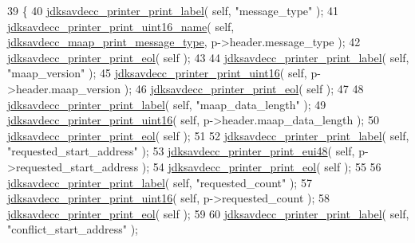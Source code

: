 \begin{DoxyCode}
39 \{
40     \hyperlink{group__util_gaf7818b24143b3c7502926a425a242ff5}{jdksavdecc\_printer\_print\_label}( \textcolor{keyword}{self}, \textcolor{stringliteral}{"message\_type"} );
41     \hyperlink{group__util_ga62486d864a66773d19bbbe23cebf346a}{jdksavdecc\_printer\_print\_uint16\_name}( \textcolor{keyword}{self}, 
      \hyperlink{group__maap__print_ga1f5dd2597dc39232da1f2dfbb975bf25}{jdksavdecc\_maap\_print\_message\_type}, p->header.message\_type );
42     \hyperlink{group__util_gacda56c9d3d24593a52c999682fa6e6e3}{jdksavdecc\_printer\_print\_eol}( \textcolor{keyword}{self} );
43 
44     \hyperlink{group__util_gaf7818b24143b3c7502926a425a242ff5}{jdksavdecc\_printer\_print\_label}( \textcolor{keyword}{self}, \textcolor{stringliteral}{"maap\_version"} );
45     \hyperlink{group__util_ga9793e0ff8e7ed25d957282ee6b257ce2}{jdksavdecc\_printer\_print\_uint16}( \textcolor{keyword}{self}, p->header.maap\_version );
46     \hyperlink{group__util_gacda56c9d3d24593a52c999682fa6e6e3}{jdksavdecc\_printer\_print\_eol}( \textcolor{keyword}{self} );
47 
48     \hyperlink{group__util_gaf7818b24143b3c7502926a425a242ff5}{jdksavdecc\_printer\_print\_label}( \textcolor{keyword}{self}, \textcolor{stringliteral}{"maap\_data\_length"} );
49     \hyperlink{group__util_ga9793e0ff8e7ed25d957282ee6b257ce2}{jdksavdecc\_printer\_print\_uint16}( \textcolor{keyword}{self}, p->header.maap\_data\_length );
50     \hyperlink{group__util_gacda56c9d3d24593a52c999682fa6e6e3}{jdksavdecc\_printer\_print\_eol}( \textcolor{keyword}{self} );
51 
52     \hyperlink{group__util_gaf7818b24143b3c7502926a425a242ff5}{jdksavdecc\_printer\_print\_label}( \textcolor{keyword}{self}, \textcolor{stringliteral}{"requested\_start\_address"} );
53     \hyperlink{group__util_gacb8108c4a12e752331804ec34d89f9ab}{jdksavdecc\_printer\_print\_eui48}( \textcolor{keyword}{self}, p->requested\_start\_address );
54     \hyperlink{group__util_gacda56c9d3d24593a52c999682fa6e6e3}{jdksavdecc\_printer\_print\_eol}( \textcolor{keyword}{self} );
55 
56     \hyperlink{group__util_gaf7818b24143b3c7502926a425a242ff5}{jdksavdecc\_printer\_print\_label}( \textcolor{keyword}{self}, \textcolor{stringliteral}{"requested\_count"} );
57     \hyperlink{group__util_ga9793e0ff8e7ed25d957282ee6b257ce2}{jdksavdecc\_printer\_print\_uint16}( \textcolor{keyword}{self}, p->requested\_count );
58     \hyperlink{group__util_gacda56c9d3d24593a52c999682fa6e6e3}{jdksavdecc\_printer\_print\_eol}( \textcolor{keyword}{self} );
59 
60     \hyperlink{group__util_gaf7818b24143b3c7502926a425a242ff5}{jdksavdecc\_printer\_print\_label}( \textcolor{keyword}{self}, \textcolor{stringliteral}{"conflict\_start\_address"} );

\end{DoxyCode}
